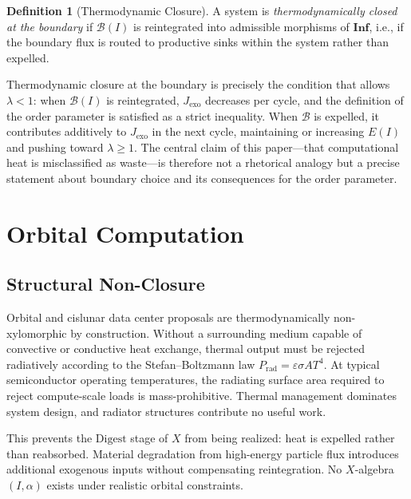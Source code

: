 \documentclass[10pt,twocolumn]{article}
\theoremstyle{plain}
\theoremstyle{definition}
\newtheorem{definition}[theorem]{Definition}
\theoremstyle{remark}
\begin{document}
\begin{definition}[Thermodynamic Closure]
A system is \emph{thermodynamically closed at the boundary} if
$\mathcal{B}(I)$ is reintegrated into admissible morphisms of
$\mathbf{Inf}$, i.e., if the boundary flux is routed to productive
sinks within the system rather than expelled.
\end{definition}

Thermodynamic closure at the boundary is precisely the condition that
allows $\lambda < 1$: when $\mathcal{B}(I)$ is reintegrated,
$J_{\mathrm{exo}}$ decreases per cycle, and the definition of the
order parameter is satisfied as a strict inequality. When $\mathcal{B}$
is expelled, it contributes additively to $J_{\mathrm{exo}}$ in the
next cycle, maintaining or increasing $E(I)$ and pushing toward
$\lambda \geq 1$. The central claim of this paper---that
computational heat is misclassified as waste---is therefore not a
rhetorical analogy but a precise statement about boundary choice and
its consequences for the order parameter.

\section{Orbital Computation}
\label{sec:orbital}

\subsection{Structural Non-Closure}

Orbital and cislunar data center proposals are thermodynamically
non-xylomorphic by construction. Without a surrounding medium capable of
convective or conductive heat exchange, thermal output must be rejected
radiatively according to the Stefan--Boltzmann law
$P_{\mathrm{rad}} = \varepsilon\sigma A T^4$. At typical semiconductor
operating temperatures, the radiating surface area required to reject
compute-scale loads is mass-prohibitive. Thermal management dominates
system design, and radiator structures contribute no useful work.

This prevents the $\mathrm{Digest}$ stage of $X$ from being realized:
heat is expelled rather than reabsorbed. Material degradation from
high-energy particle flux introduces additional exogenous inputs without
compensating reintegration. No $X$-algebra $(I,\alpha)$ exists under
realistic orbital constraints.
\end{document}
